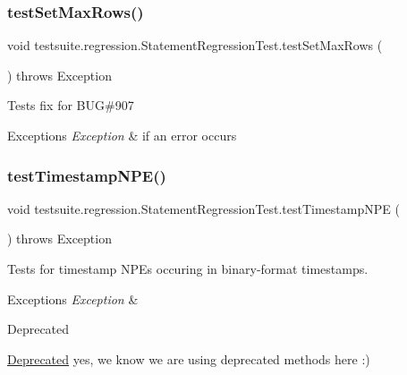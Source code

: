\subsubsection{\texorpdfstring{test\+Set\+Max\+Rows()}{testSetMaxRows()}}
{\footnotesize\ttfamily void testsuite.\+regression.\+Statement\+Regression\+Test.\+test\+Set\+Max\+Rows (\begin{DoxyParamCaption}{ }\end{DoxyParamCaption}) throws Exception}

Tests fix for B\+UG\#907


\begin{DoxyExceptions}{Exceptions}
{\em Exception} & if an error occurs \\
\hline
\end{DoxyExceptions}
\mbox{\label{classtestsuite_1_1regression_1_1_statement_regression_test_adddbda10c165cfaf7d3ae1266e7a66ab}} 
\subsubsection{\texorpdfstring{test\+Timestamp\+N\+P\+E()}{testTimestampNPE()}}
{\footnotesize\ttfamily void testsuite.\+regression.\+Statement\+Regression\+Test.\+test\+Timestamp\+N\+PE (\begin{DoxyParamCaption}{ }\end{DoxyParamCaption}) throws Exception}

Tests for timestamp N\+P\+Es occuring in binary-\/format timestamps.


\begin{DoxyExceptions}{Exceptions}
{\em Exception} & \\
\hline
\end{DoxyExceptions}
\begin{DoxyRefDesc}{Deprecated}
\item[\mbox{\hyperlink{deprecated__deprecated000009}{Deprecated}}]yes, we know we are using deprecated methods here \+:) \end{DoxyRefDesc}
\mbox{\label{classtestsuite_1_1regression_1_1_statement_regression_test_aafc5cbe7d1a8aa3033e86c9f0cd8c08a}} 
